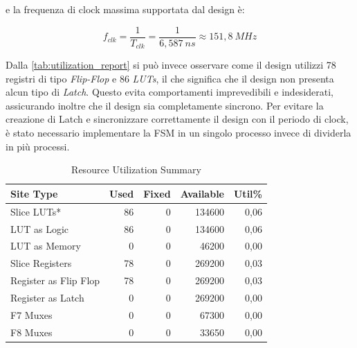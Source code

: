 \documentclass[11pt,a4paper]{article}
\begin{document}
e la frequenza di clock massima supportata dal design è:

\begin{equation}
    f_{clk} = \frac{1}{T_{clk}} = \frac{1}{6,587\ ns} \approx 151,8\ MHz
\end{equation}

\vspace{1em}
Dalla \autoref{tab:utilization_report} si può invece osservare come il design utilizzi 78 registri di tipo \textit{Flip-Flop} e 86 \textit{LUTs}, il che significa che il design non presenta alcun tipo di \textit{Latch}. Questo evita comportamenti imprevedibili e indesiderati, assicurando inoltre che il design sia completamente sincrono. Per evitare la creazione di Latch e sincronizzare correttamente il design con il periodo di clock, è stato necessario implementare la FSM in un singolo processo invece di dividerla in più processi.

\begin{table}[ht]
    \centering
    \begin{tabular}{lrrrr}
        \toprule
        \textbf{Site Type}          & \textbf{Used} & \textbf{Fixed} & \textbf{Available} & \textbf{Util\%} \\
        \midrule
        Slice LUTs*                 & 86            & 0              & 134600             & 0,06            \\
        \addlinespace
        \quad LUT as Logic          & 86            & 0              & 134600             & 0,06            \\
        \addlinespace
        \quad LUT as Memory         & 0             & 0              & 46200              & 0,00            \\
        \midrule
        Slice Registers             & 78            & 0              & 269200             & 0,03            \\
        \addlinespace
        \quad Register as Flip Flop & 78            & 0              & 269200             & 0,03            \\
        \addlinespace
        \quad Register as Latch     & 0             & 0              & 269200             & 0,00            \\
        \midrule
        F7 Muxes                    & 0             & 0              & 67300              & 0,00            \\
        \addlinespace
        F8 Muxes                    & 0             & 0              & 33650              & 0,00            \\
        \bottomrule
    \end{tabular}
    \caption{Resource Utilization Summary}
    \label{tab:utilization_report}
\end{table}
\end{document}
